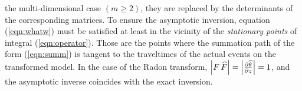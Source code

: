 the multi-dimensional case $(m \geq 2)$, they are replaced by the
determinants of the corresponding matrices. To ensure the asymptotic
inversion, equation (\ref{eqn:whatw}) must be satisfied at least in
the vicinity of the {\em stationary points} of integral
(\ref{eqn:operator}).  Those are the points where the summation path
of the form (\ref{eqn:summ}) is tangent to the traveltimes of the
actual events on the transformed model.
In the case of the Radon transform,
$\left|F\,\widehat{F}\right|=\left|\partial \widehat{\theta} \over
\partial z\right|=1$, and the asymptotic inverse coincides with the
exact inversion.

